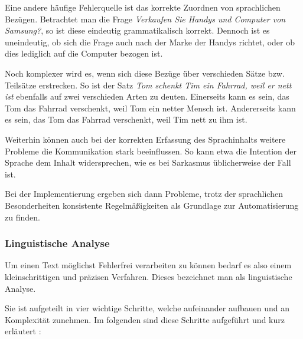 \documentclass[12pt]{report}
\begin{document}
Eine andere häufige Fehlerquelle ist das korrekte Zuordnen von sprachlichen Bezügen. Betrachtet man die Frage \glqq \textit{Verkaufen Sie Handys und Computer von Samsung?}\grqq, so ist diese eindeutig grammatikalisch korrekt. Dennoch ist es uneindeutig, ob sich die Frage auch nach der Marke der Handys richtet, oder ob dies lediglich auf die Computer bezogen ist. 

Noch komplexer wird es, wenn sich diese Bezüge über verschieden Sätze bzw. Teilsätze erstrecken. So ist der Satz \glqq \textit{Tom schenkt Tim ein Fahrrad, weil er nett ist}\grqq{} ebenfalls auf zwei verschieden Arten zu deuten. Einerseits kann es sein, das Tom das Fahrrad verschenkt, weil Tom ein netter Mensch ist. Andererseits kann es sein, das Tom das Fahrrad verschenkt, weil Tim nett zu ihm ist. 

Weiterhin können auch bei der korrekten Erfassung des Sprachinhalts weitere Probleme die Kommunikation stark beeinflussen. So kann etwa die Intention der Sprache dem Inhalt widersprechen, wie es bei Sarkasmus üblicherweise der Fall ist. 

Bei der Implementierung ergeben sich dann Probleme, trotz der sprachlichen Besonderheiten konsistente Regelmäßigkeiten als Grundlage zur Automatisierung zu finden. 

\subsubsection{Linguistische Analyse}
Um einen Text möglichst Fehlerfrei verarbeiten zu können bedarf es also einem kleinschrittigen und präzisen Verfahren. Dieses bezeichnet man als linguistische Analyse.

Sie ist aufgeteilt in vier wichtige Schritte, welche aufeinander aufbauen und an Komplexität zunehmen. Im folgenden sind diese Schritte aufgeführt und kurz erläutert \cite{rs18}:
\end{document}
